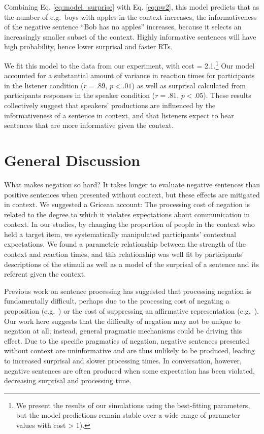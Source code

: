 \documentclass[man]{apa2}
\begin{document}
\noindent Combining Eq. \ref{eq:model_surprise} with Eq. \ref{eq:pw2}, this model predicts that as the number of e.g.\ boys with apples in the context increases, the informativeness of the negative sentence ``Bob has no apples'' increases, because it selects an increasingly smaller subset of the context. Highly informative sentences will have high probability, hence lower surprisal and faster RTs. 

We fit this model to the data from our experiment, with cost = 2.1.\footnote{We present the results of our simulations using the best-fitting parameters, but the model predictions remain stable over a wide range of parameter values with cost > 1).}  Our model accounted for a substantial amount of variance in reaction times for participants in the listener condition ($r=.89$, $p<.01$) as well as surprisal calculated from participants responses in the speaker condition ($r=.81$, $p<.05$).  These results collectively suggest that  speakers' productions are influenced by the informativeness of a sentence in context, and that listeners expect to hear sentences that are more informative given the context.

\section{General Discussion}

What makes negation so hard? It takes longer to evaluate negative sentences than positive sentences when presented without context, but these effects are mitigated in context. We suggested a Gricean account: The processing cost of negation is related to the degree to which it violates expectations about communication in context. In our studies, by changing the proportion of people in the context who held a target item, we systematically manipulated participants' contextual expectations.  We found a parametric relationship between the strength of the context and reaction times, and this relationship was well fit by participants' descriptions of the stimuli as well as a model of the surprisal of a sentence and its referent given the context.

Previous work on sentence processing has suggested that processing negation is fundamentally difficult, perhaps due to the processing cost of negating a proposition (e.g.\ ) or the cost of suppressing an affirmative representation (e.g.\ ).  Our work here suggests that the difficulty of negation may not be unique to negation at all; instead, general pragmatic mechanisms could be driving this effect.  Due to the specific pragmatics of negation, negative sentences presented without context are uninformative and are thus unlikely to be produced, leading to increased surprisal and slower processing times.  In conversation, however, negative sentences are often produced when some expectation has been violated, decreasing surprisal and processing time.  
\end{document}
